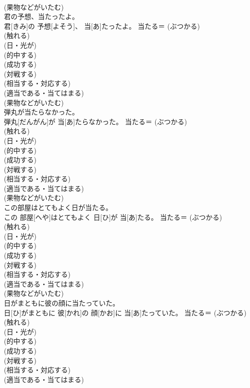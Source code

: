 \documentclass[8pt]{extreport}
\begin{document}
\begin{CJK}{UTF8}{min}
{\\	(果物などがいたむ)
\\	君の予想、当たったよ。	
\\	君[きみ]の 予想[よそう]、 当[あ]たったよ。	当たる＝ (ぶつかる) 
\\	(触れる) 
\\	(日・光が) 
\\	(的中する) 
\\	(成功する) 
\\	(対戦する) 
\\	(相当する・対応する) 
\\	(適当である・当てはまる) 
\\	(果物などがいたむ)
\\	弾丸が当たらなかった。	
\\	弾丸[だんがん]が 当[あ]たらなかった。	当たる＝ (ぶつかる) 
\\	(触れる) 
\\	(日・光が) 
\\	(的中する) 
\\	(成功する) 
\\	(対戦する) 
\\	(相当する・対応する) 
\\	(適当である・当てはまる) 
\\	(果物などがいたむ)
\\	この部屋はとてもよく日が当たる。	
\\	この 部屋[へや]はとてもよく 日[ひ]が 当[あ]たる。	当たる＝ (ぶつかる) 
\\	(触れる) 
\\	(日・光が) 
\\	(的中する) 
\\	(成功する) 
\\	(対戦する) 
\\	(相当する・対応する) 
\\	(適当である・当てはまる) 
\\	(果物などがいたむ)
\\	日がまともに彼の顔に当たっていた。	
\\	日[ひ]がまともに 彼[かれ]の 顔[かお]に 当[あ]たっていた。	当たる＝ (ぶつかる) 
\\	(触れる) 
\\	(日・光が) 
\\	(的中する) 
\\	(成功する) 
\\	(対戦する) 
\\	(相当する・対応する) 
\\	(適当である・当てはまる) 
}
\end{CJK}
\end{document}
